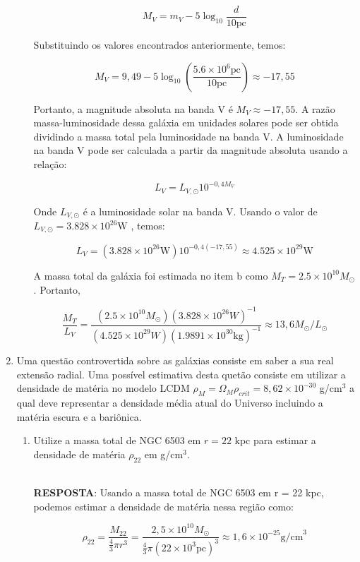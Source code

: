 \documentclass[a4paper,12pt]{article}
\begin{document}
\begin{enumerate}
\begin{enumerate}
$$M_V = m_V - 5 \log_{10} \frac{d}{10 \text{pc}}$$

Substituindo os valores encontrados anteriormente, temos:

$$M_V = 9,49 - 5 \log_{10} \left(\frac{5.6 \times 10^6 \text{pc}}{10 \text{pc}}\right) \approx -17,55$$

Portanto, a magnitude absoluta na banda V é $M_V \approx -17,55$. A razão massa-luminosidade dessa galáxia em unidades solares pode ser obtida dividindo a massa total pela luminosidade na banda V. A luminosidade na banda V pode ser calculada a partir da magnitude absoluta usando a relação:

$$L_V = L_{V,\odot} 10^{-0,4 M_V}$$

Onde $L_{V,\odot}$ é a luminosidade solar na banda V. Usando o valor de $L_{V,\odot} = 3.828 \times 10^{26} \text{W}$ , temos:

$$L_V = (3.828 \times 10^{26} \text{W}) 10^{-0,4 (-17,55)} \approx 4.525 \times 10^{29} \text{W}$$

A massa total da galáxia foi estimada no item b como $M_T = 2.5 \times 10^{10} M_\odot$. Portanto,

$$\frac{M_T}{L_V} = \frac{(2.5 \times 10^{10} M_\odot) (3.828 \times 10^{26} W)^{-1}}{(4.525 \times 10^{29} W) (1.9891\times 10^{30}\text{kg})^{-1}} \approx 13,6 M_\odot/L_\odot $$

\noindent\hrulefill

\end{enumerate}

\item Uma questão controvertida sobre as galáxias consiste em saber a sua real extensão radial. Uma possível estimativa desta quetão consiste em utilizar a densidade de matéria no modelo LCDM $\rho_M = \Omega_M\rho_{crit}= 8,62\times10^{-30}$ g/cm$^3$ a qual deve representar a densidade média atual do Universo incluindo a matéria escura e a bariônica. 

\begin{enumerate}
    
\item Utilize a massa total de NGC 6503 em $r = 22$ kpc para estimar a densidade de matéria $\rho_{22}$ em g/cm$^3$.

\noindent\hrulefill\\\textbf{RESPOSTA}: Usando a massa total de NGC 6503 em r = 22 kpc, podemos estimar a densidade de matéria nessa região como:

$$\rho_{22} = \frac{M_{22}}{\frac{4}{3}\pi r^3} = \frac{2,5 \times 10^{10} M_\odot}{\frac{4}{3}\pi (22 \times 10^3 \text{pc})^3} \approx 1,6 \times 10^{-25} \text{g/cm}^3$$


\end{enumerate}
\end{enumerate}
\end{document}
